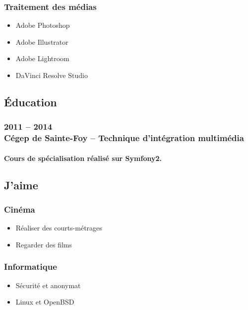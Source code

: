 \documentclass{resume}
\begin{document}
\begin{multicols}{2}
{\begin{multicols}{2}
			\subsubsection*{Traitement des médias}
			\begin{itemize}
				\scriptsize
				\item Adobe Photoshop
				\item Adobe Illustrator
				\item Adobe Lightroom
				\item DaVinci Resolve Studio
			\end{itemize}
		 \end{multicols}}
	\end{multicols}

	\vspace{2.5mm}

	\begin{multicols}{2}
		\subsection*{Éducation}
			\subsubsection*{2011 – 2014 \\ Cégep de Sainte-Foy – Technique d'intégration multimédia}
			\paragraph{Cours de spécialisation réalisé sur Symfony2.}

		\columnbreak

		\subsection*{J'aime}
			{\setlength\multicolsep{0pt}
			 \begin{multicols}{2}
				\subsubsection*{Cinéma}
				\begin{itemize}
					\scriptsize
					\item Réaliser des courts-métrages
					\item Regarder des films
				\end{itemize}

				\subsubsection*{Informatique}
				\begin{itemize}
					\scriptsize
					\item Sécurité et anonymat
					\item Linux et OpenBSD
				\end{itemize}
			 \end{multicols}}
	\end{multicols}
\end{document}
